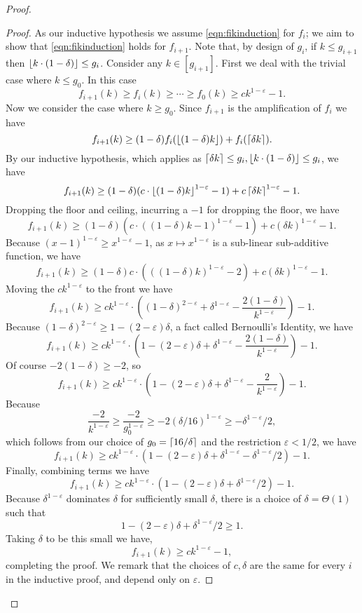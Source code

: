\begin{proof}
\begin{proof}
  As our inductive hypothesis we assume
  \eqref{eqn:fikinduction} for $f_i$; we aim to show that 
  \eqref{eqn:fikinduction} holds for $f_{i+1}$. Note that, by
  design of $g_i$, if $k \le g_{i+1}$ then $\left\lfloor k\cdot (1-\delta) \right\rfloor \le g_i$.
  Consider any $k\in [g_{i+1}]$. First we deal with the trivial
  case where $k \le g_0$. In this case 
  $$f_{i+1}(k) \ge f_i(k) \ge \cdots \ge f_0(k) \ge ck^{1-\varepsilon} -1.$$
  Now we consider the case where $k \ge g_0$.
  Since $f_{i+1}$ is the amplification of $f_i$ we have
  $$f_{i+1}(k) \ge (1-\delta) f_i(\left\lfloor (1-\delta)k \right\rfloor) + f_i(\left\lceil \delta k \right\rceil).$$
  By our inductive hypothesis, which applies as $\left\lceil \delta k \right\rceil\le g_i, \left\lfloor k\cdot (1-\delta) \right\rfloor \le g_i$, we have
  $$f_{i+1}(k) \ge (1-\delta) (c \cdot\left\lfloor (1-\delta)k \right\rfloor^{1-\varepsilon}-1) + c\left\lceil \delta k \right\rceil^{1-\varepsilon} - 1. $$
  Dropping the floor and ceiling, incurring a $-1$ for dropping the floor, we have
  $$f_{i+1}(k) \ge (1-\delta) (c \cdot ((1-\delta)k-1)^{1-\varepsilon}-1) + c (\delta k)^{1-\varepsilon} - 1.$$
  Because $(x-1)^{1-\varepsilon} \ge x^{1-\varepsilon} -1$, as $x\mapsto x^{1-\varepsilon}$ is a sub-linear
  sub-additive function, we have 
  $$f_{i+1}(k) \ge (1-\delta) c \cdot (((1-\delta)k)^{1-\varepsilon}-2) + c(\delta k)^{1-\varepsilon}-1.$$
  Moving the $ck^{1-\varepsilon}$ to the front we have
  $$ f_{i+1}(k) \ge ck^{1-\varepsilon} \cdot\left((1-\delta)^{2-\varepsilon} + \delta^{1-\varepsilon} - \frac{2(1-\delta)}{k^{1-\varepsilon}} \right) -1.$$
  Because $(1-\delta)^{2-\varepsilon} \ge 1-(2-\varepsilon)\delta$, a fact called Bernoulli's Identity, we have
  $$f_{i+1}(k) \ge ck^{1-\varepsilon} \cdot\left(1-(2-\varepsilon)\delta + \delta^{1-\varepsilon} - \frac{2(1-\delta)}{k^{1-\varepsilon}} \right)-1.$$
  Of course $-2(1-\delta) \ge -2$, so 
  $$f_{i+1}(k) \ge ck^{1-\varepsilon} \cdot\left(1-(2-\varepsilon)\delta + \delta^{1-\varepsilon} - \frac{2}{k^{1-\varepsilon}} \right) -1.$$
  Because 
  $$\frac{-2}{k^{1-\varepsilon}} \ge \frac{-2}{g_0^{1-\varepsilon}} \ge -2(\delta/16)^{1-\varepsilon} \ge -\delta^{1-\varepsilon}/2,$$ 
  which follows from our choice of $g_0 = \left\lceil 16/\delta \right\rceil$ and the restriction
  $\varepsilon<1/2$, we have
  $$f_{i+1}(k) \ge ck^{1-\varepsilon}
  \cdot\left(1-(2-\varepsilon)\delta + \delta^{1-\varepsilon} - \delta^{1-\varepsilon}/2 \right)-1.$$
  Finally, combining terms we have
  $$f_{i+1}(k) \ge  ck^{1-\varepsilon} \cdot\left(1-(2-\varepsilon)\delta + \delta^{1-\varepsilon}/2\right)-1. $$
  Because $\delta^{1-\varepsilon}$ dominates $\delta$ for
  sufficiently small $\delta$, there is a choice of
  $\delta=\Theta(1)$ such that 
  $$1-(2-\varepsilon)\delta + \delta^{1-\varepsilon}/2 \ge 1.$$ 
  Taking $\delta$ to be this
  small we have,
  $$f_{i+1}(k) \ge ck^{1-\varepsilon}-1,$$
  completing the proof. We remark that the choices of $c, \delta$
  are the same for every $i$ in the inductive proof, and depend
  only on $\varepsilon$. 
  \end{proof}


\end{proof}
